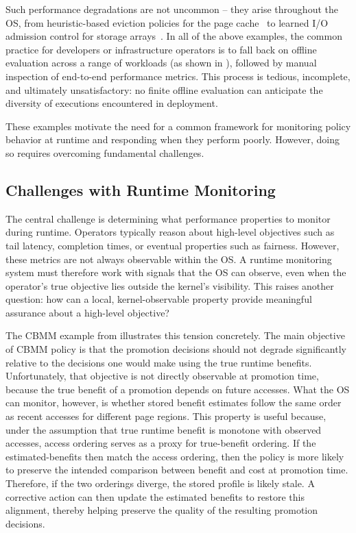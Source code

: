 Such performance degradations are not uncommon -- they arise throughout the OS, from heuristic-based eviction policies for the page cache~\cite{cache-ext-sosp25} to learned I/O admission control for storage arrays~\cite{linnos-osdi20}.
In all of the above examples, the common practice for developers or infrastructure operators is to fall back on offline evaluation across a range of workloads (as shown in ), followed by manual inspection of end-to-end performance metrics.
This process is tedious, incomplete, and ultimately unsatisfactory: no finite offline evaluation can anticipate the diversity of executions encountered in deployment.

These examples motivate the need for a common framework for monitoring policy behavior at runtime and responding when they perform poorly. However, doing so requires overcoming fundamental challenges. %

\subsection{Challenges with Runtime Monitoring}
The central challenge is determining what performance properties to monitor during runtime. Operators typically reason about high-level objectives such as tail latency, completion times, or eventual properties such as fairness. However, these metrics are not always observable within the OS.
A runtime monitoring system must therefore work with signals that the OS can observe, even when the operator's true objective lies outside the kernel's visibility. This raises another question: how can a local, kernel-observable property provide meaningful assurance about a high-level objective?

The CBMM example from  illustrates this tension concretely. The main objective of CBMM policy is that the promotion decisions should not degrade significantly relative to the decisions one would make using the true runtime benefits. Unfortunately, that objective is not directly observable at promotion time, because the true benefit of a promotion depends on future accesses.
What the OS can monitor, however, is whether stored benefit estimates follow the same order as recent accesses for different page regions.
This property is useful because, under the assumption that true runtime benefit is monotone with observed accesses, access ordering serves as a proxy for true-benefit ordering. If the estimated-benefits then match the access ordering, then the policy is more likely to preserve the intended comparison between benefit and cost at promotion time. Therefore, if the two orderings diverge, the stored profile is likely stale. A corrective action can then update the estimated benefits to restore this alignment, thereby helping preserve the quality of the resulting promotion decisions.


